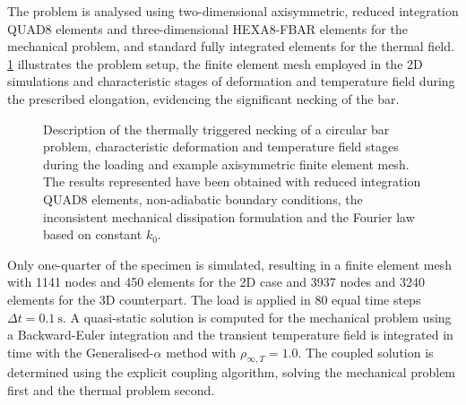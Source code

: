 The problem is analysed using two-dimensional axisymmetric, reduced integration QUAD8 elements and three-dimensional HEXA8-FBAR elements \cite{desouzaneto1996DesignSimpleLow} for the mechanical problem, and standard fully integrated elements for the thermal field.
\ref{fig:necking} illustrates the problem setup, the finite element mesh employed in the 2D simulations and characteristic stages of deformation and temperature field during the prescribed elongation, evidencing the significant necking of the bar.
%
\begin{figure}[p]
  \centering
  \caption{Description of the thermally triggered necking of a circular bar problem, characteristic deformation and temperature field stages during the loading and example axisymmetric finite element mesh. The results represented have been obtained with reduced integration QUAD8 elements, non-adiabatic boundary conditions, the inconsistent mechanical dissipation formulation and the Fourier law based on constant $k_{0}$.}
  \label{fig:necking}
\end{figure}
%
Only one-quarter of the specimen is simulated, resulting in a finite element mesh with 1141 nodes and 450 elements for the 2D case and  3937 nodes and 3240 elements for the 3D counterpart.
The load is applied in 80 equal time steps $\Delta t = \SI{0.1}{\second}$.
A quasi-static solution is computed for the mechanical problem using a Backward-Euler integration and the transient temperature field is integrated in time with the Generalised-$\alpha$ method with $\rho_{\infty,T}=1.0$.
The coupled solution is determined using the explicit coupling algorithm, solving the mechanical problem first and the thermal problem second.

